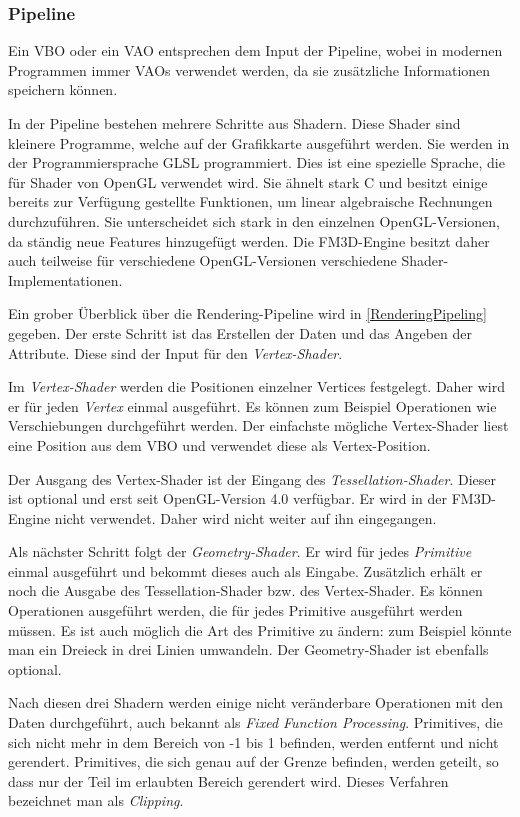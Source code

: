 \subsubsection{Pipeline \cite{Pipeline}}
Ein \ac{VBO} oder ein \ac{VAO} entsprechen dem Input der Pipeline, wobei in modernen Programmen immer \acp{VAO} verwendet werden, da sie zusätzliche Informationen speichern können.

In der Pipeline bestehen mehrere Schritte aus Shadern. Diese Shader sind kleinere Programme, welche auf der Grafikkarte ausgeführt werden. Sie werden in der Programmiersprache GLSL programmiert. 
Dies ist eine spezielle Sprache, die für Shader von OpenGL verwendet wird. Sie ähnelt stark C und besitzt einige bereits zur Verfügung gestellte Funktionen, um linear algebraische Rechnungen durchzuführen. 
Sie unterscheidet sich stark in den einzelnen OpenGL-Versionen, da ständig neue Features hinzugefügt werden. Die FM3D-Engine besitzt daher auch teilweise für verschiedene OpenGL-Versionen verschiedene Shader-Implementationen.

Ein grober Überblick über die Rendering-Pipeline wird in \cref{RenderingPipeling} gegeben. Der erste Schritt ist das Erstellen der Daten und das Angeben der Attribute. Diese sind der Input für den \textit{Vertex-Shader}. 

Im \textit{Vertex-Shader} werden die Positionen einzelner Vertices festgelegt. Daher wird er für jeden \textit{Vertex} einmal ausgeführt. Es können zum Beispiel Operationen wie Verschiebungen durchgeführt werden. Der einfachste mögliche Vertex-Shader liest eine Position aus dem \ac{VBO} und verwendet diese als Vertex-Position. 

Der Ausgang des Vertex-Shader ist der Eingang des \textit{Tessellation-Shader}. Dieser ist optional und erst seit OpenGL-Version 4.0 verfügbar. Er wird in der FM3D-Engine nicht verwendet. Daher wird nicht weiter auf ihn eingegangen.

Als nächster Schritt folgt der \textit{Geometry-Shader}. Er wird für jedes \textit{Primitive} einmal ausgeführt und bekommt dieses auch als Eingabe. 
Zusätzlich erhält er noch die Ausgabe des Tessellation-Shader bzw. des Vertex-Shader. Es können Operationen ausgeführt werden, die für jedes Primitive ausgeführt werden müssen. Es ist auch möglich die Art des Primitive zu ändern: zum Beispiel könnte man ein Dreieck in drei Linien umwandeln. Der Geometry-Shader ist ebenfalls optional.

Nach diesen drei Shadern werden einige nicht veränderbare Operationen mit den Daten durchgeführt, auch bekannt als \textit{Fixed Function Processing}. 
Primitives, die sich nicht mehr in dem Bereich von -1 bis 1 befinden, werden entfernt und nicht gerendert. Primitives, die sich genau auf der Grenze befinden, werden geteilt, so dass nur der Teil im erlaubten Bereich gerendert wird. Dieses Verfahren bezeichnet man als \textit{Clipping}.

